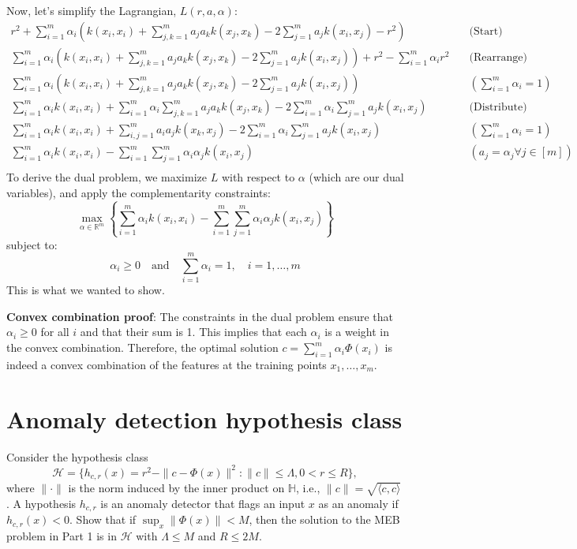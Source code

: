 \documentclass{article}
\begin{document}
Now, let's simplify the Lagrangian, $L(r, a, \alpha)$:
\begin{align*}
r^2 + \sum_{i=1}^{m} \alpha_i \left( k(x_i, x_i) + \sum_{j,k=1}^{m} a_j a_k k(x_j, x_k) - 2 \sum_{j=1}^{m} a_j k(x_i, x_j) - r^2 \right) &\quad\text{(Start)} \\
\sum_{i=1}^{m} \alpha_i \left( k(x_i, x_i) + \sum_{j,k=1}^{m} a_j a_k k(x_j, x_k) - 2 \sum_{j=1}^{m} a_j k(x_i, x_j) \right) + r^2 - \sum_{i=1}^{m} \alpha_i r^2 &\quad\text{(Rearrange)}\\
\sum_{i=1}^{m} \alpha_i \left( k(x_i, x_i) + \sum_{j,k=1}^{m} a_j a_k k(x_j, x_k) - 2 \sum_{j=1}^{m} a_j k(x_i, x_j) \right) &\quad \left(\sum_{i=1}^{m} \alpha_i = 1\right)\\
\sum_{i=1}^{m} \alpha_i k(x_i, x_i) +\sum_{i=1}^{m} \alpha_i  \sum_{j,k=1}^{m} a_j a_k k(x_j, x_k) - 2\sum_{i=1}^{m} \alpha_i  \sum_{j=1}^{m} a_j k(x_i, x_j) &\quad \text{(Distribute)}\\
\sum_{i=1}^{m} \alpha_i k(x_i, x_i) + \sum_{i,j=1}^{m} a_i a_j k(x_k, x_j) - 2\sum_{i=1}^{m} \alpha_i  \sum_{j=1}^{m} a_j k(x_i, x_j) &\quad \left(\sum_{i=1}^{m} \alpha_i = 1\right)\\
\sum_{i=1}^{m} \alpha_i k(x_i, x_i) - \sum_{i=1}^{m}\sum_{j=1}^{m} \alpha_i\alpha_j k(x_i, x_j) &\quad \left(a_j = \alpha_j \forall j \in [m]\right)\\
\end{align*}
To derive the dual problem, we maximize \( L \) with respect to \( \alpha \) (which are our dual variables), and apply the complementarity constraints:
\[ \max_{\alpha \in \mathbb{R}^m} \left\{ \sum_{i=1}^m \alpha_i k(x_i, x_i) - \sum_{i=1}^m \sum_{j=1}^m \alpha_i \alpha_j k(x_i, x_j) \right\} \]
subject to:
\[ \alpha_i \geq 0 \quad \text{and} \quad \sum_{i=1}^{m} \alpha_i = 1, \quad i = 1, \dots, m \]
This is what we wanted to show.

\textbf{Convex combination proof}:
The constraints in the dual problem ensure that \( \alpha_i \geq 0 \) for all \( i \) and that their sum is 1. This implies that each \( \alpha_i \) is a weight in the convex combination. Therefore, the optimal solution \( c = \sum_{i=1}^{m} \alpha_i \Phi(x_i) \) is indeed a convex combination of the features at the training points \( x_1, \dots, x_m \).

\section{Anomaly detection hypothesis class}
Consider the hypothesis class
$$\mathcal{H} = \lbrace h_{c,r}(x) = r^2 - \|c - \Phi(x)\|^2 : \|c\| \leq \Lambda, 0 < r \leq R \rbrace,$$
where $\|\cdot\|$ is the norm induced by the inner product on $\mathbb{H}$, i.e., $\|c\| = \sqrt{\langle c, c \rangle}$.
A hypothesis $h_{c,r}$ is an anomaly detector that flags an input $x$ as an anomaly if $h_{c,r}(x) < 0$.
Show that if $\sup_x{\|\Phi(x)\| < M}$, then the solution to the MEB problem in Part 1 is in $\mathcal{H}$ with $\Lambda \leq M$ and $R \leq 2M$.
\end{document}
